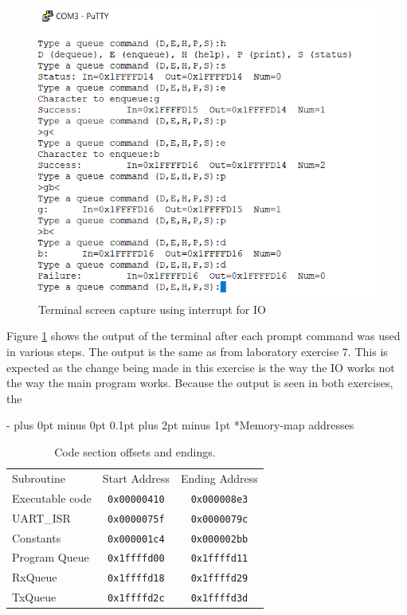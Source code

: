 \documentclass[\FontSize\FontUnit,letterpaper,oneside]{article}
\makeatletter
\def\code#1{\texttt{#1}}
\renewcommand \section{
    \@startsection{section}{1}{\z@}
      {\dimexpr \FontSize\FontUnit * 2 - \parskip \relax plus 0pt minus 0pt}
      {0.1pt plus 2pt minus 1pt} %
      {\normalfont\normalsize\bfseries}}
\makeatother
\begin{document}
\begin{figure}[h!]
	\centering
	\includegraphics{capture}
	\caption{Terminal screen capture using interrupt for IO}
	\label{fig:capture1}
\end{figure}

Figure \ref{fig:capture1} shows the output of the terminal after each prompt command was used in various steps. The output is the same as from laboratory exercise 7. This is expected as the change being made in this exercise is the way the IO works not the way the main program works. Because the output is seen in both exercises, the 

\section*{Memory-map addresses}

\begin{table}[h!]
\begin{center}
\caption{Code section offsets and endings.}
\label{tab:q1}
\begin{tabular}{ |l||c|c| }
\hline
Subroutine & Start Address & Ending Address \\\hhline{|=||=|=|}
Executable code & \code{0x00000410} & \code{0x000008e3} \\\hline 
UART\_ISR & \code{0x0000075f} & \code{0x0000079c} \\\hline 
Constants & \code{0x000001c4} & \code{0x000002bb} \\\hline
Program Queue & \code{0x1ffffd00} & \code{0x1ffffd11} \\\hline
RxQueue & \code{0x1ffffd18} & \code{0x1ffffd29} \\\hline
TxQueue & \code{0x1ffffd2c} & \code{0x1ffffd3d} \\\hline
\end{tabular}
\end{center}
\end{table}

\label{LastPage}
\end{document}
